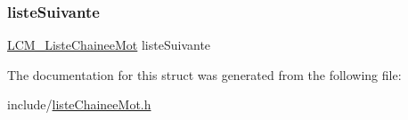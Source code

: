 \mbox{\label{struct_l_c_m___noeud_a422b2aadd62b7996fbd4a00da43e47ab}} 
\subsubsection{\texorpdfstring{liste\+Suivante}{listeSuivante}}
{\footnotesize\ttfamily \hyperlink{liste_chainee_mot_8h_ad50c59d1ac1fa184aba663121d8e4087}{L\+C\+M\+\_\+\+Liste\+Chainee\+Mot} liste\+Suivante}



The documentation for this struct was generated from the following file\+:\begin{DoxyCompactItemize}
\item 
include/\hyperlink{liste_chainee_mot_8h}{liste\+Chainee\+Mot.\+h}\end{DoxyCompactItemize}
